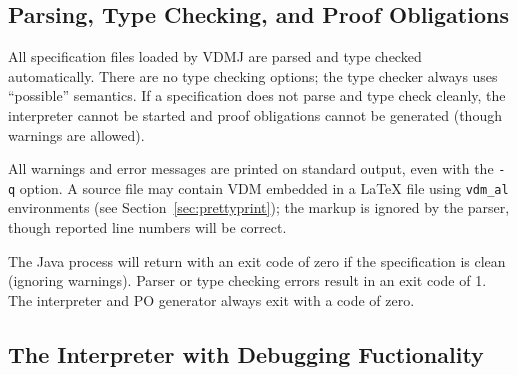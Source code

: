 \documentclass{overturerep}
\begin{document}
{%



\subsection{Parsing, Type Checking, and Proof Obligations}

All specification files loaded by VDMJ are parsed and type checked
automatically. There are no type checking options; the type checker
always uses ``possible'' semantics. If a specification does not parse
and type check cleanly, the interpreter cannot be started and proof
obligations cannot be generated (though warnings are allowed).

All warnings and error messages are printed on standard output, even
with the \texttt{-q} option.  A source file may contain VDM embedded
in a LaTeX file using \verb|vdm_al| environments (see
Section~\ref{sec:prettyprint}); the markup is ignored by the parser,
though reported line numbers will be correct.

The Java process will return with an exit code of zero if the
specification is clean (ignoring warnings).  Parser or type checking
errors result in an exit code of 1. The interpreter and PO generator
always exit with a code of zero.

\subsection{The Interpreter with Debugging Fuctionality}

}
\end{document}
